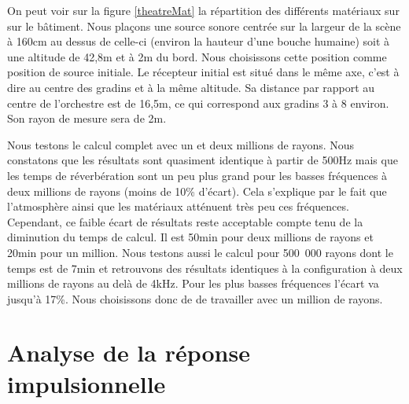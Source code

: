 On peut voir sur la figure \ref{theatreMat} la répartition des différents matériaux sur sur le bâtiment. Nous plaçons une source sonore centrée sur la largeur de la scène à 160cm au dessus de celle-ci (environ la hauteur d'une bouche humaine) soit à une altitude de 42,8m et à 2m du bord. Nous choisissons cette position comme position de source initiale. Le récepteur initial est situé dans le même axe, c'est à dire au centre des gradins et à la même altitude. Sa distance par rapport au centre de l'orchestre est de 16,5m, ce qui correspond aux gradins 3 à 8 environ. Son rayon de mesure sera de 2m. 

Nous testons le calcul complet avec un et deux millions de rayons. Nous constatons que les résultats sont quasiment identique à partir de 500Hz mais que les temps de réverbération sont un peu plus grand pour les basses fréquences à deux millions de rayons (moins de 10\% d'écart). Cela s'explique par le fait que l'atmosphère ainsi que les matériaux atténuent très peu ces fréquences. Cependant, ce faible écart de résultats reste acceptable compte tenu de la diminution du temps de calcul. Il est 50min pour deux millions de rayons et 20min pour un million. Nous testons aussi le calcul pour 500~000 rayons dont le temps est de 7min et retrouvons des résultats identiques à la configuration à deux millions de rayons au delà de 4kHz. Pour les plus basses fréquences l'écart va jusqu'à 17\%. Nous choisissons donc de de travailler avec un million de rayons.



\section{Analyse de la réponse impulsionnelle}



